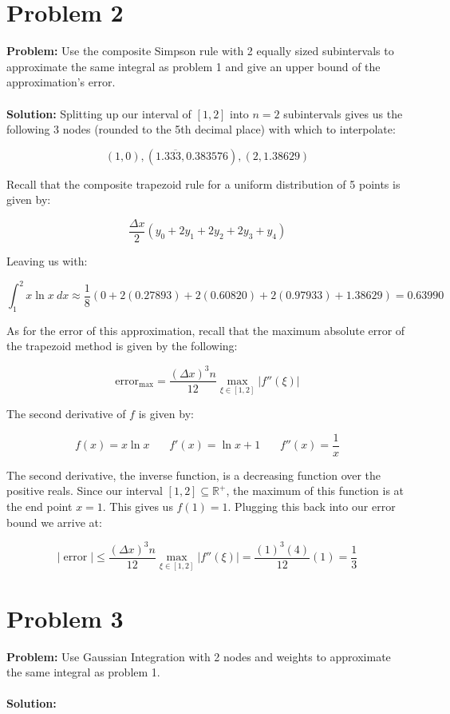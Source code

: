 \documentclass{article}
\begin{document}
\section*{Problem 2}
\textbf{Problem:} Use the composite Simpson rule with 2 equally sized subintervals to approximate the same integral as problem 1 and give an upper bound of the approximation's error.
\\\\
\textbf{Solution:} Splitting up our interval of $[1,2]$ into $n=2$ subintervals gives us the following 3 nodes (rounded to the 5th decimal place) with which to interpolate:

$$\left(1,0\right), \left(1.3\overline{33},0.383576\right), \left(2,1.38629\right)$$

Recall that the composite trapezoid rule for a uniform distribution of 5 points is given by:

$$\frac{\Delta x}{2}\left(y_0+2y_1+2y_2+2y_3+y_4\right)$$

Leaving us with:

$$\int^2_1 x\ln x\ dx\approx\frac{1}{8}\left(0+2(0.27893)+2(0.60820)+2(0.97933)+1.38629\right)=\boxed{0.63990}$$

As for the error of this approximation, recall that the maximum absolute error of the trapezoid method is given by the following:

$$\operatorname{error_{\text{max}}}=\frac{(\Delta x)^3n}{12}\max_{\xi\in[1,2]}|f''(\xi)|$$

The second derivative of $f$ is given by:

$$f(x)=x\ln x\ \ \ \ \ \ \ \  f'(x)=\ln x + 1\ \ \ \ \ \ \ \  f''(x)=\frac{1}{x}$$

The second derivative, the inverse function, is a decreasing function over the positive reals. Since our interval $[1,2]\subseteq\mathbb R^+$, the maximum of this function is at the end point $x=1$. This gives us $f(1)=1$. Plugging this back into our error bound we arrive at:

$$|\operatorname{error}|\le \frac{(\Delta x)^3n}{12}\max_{\xi\in[1,2]}|f''(\xi)|=\frac{(1)^3(4)}{12}(1)=\boxed{\frac{1}{3}}$$

\section*{Problem 3}
\textbf{Problem:} Use Gaussian Integration with 2 nodes and weights to approximate the same integral as problem 1.
\\\\
\textbf{Solution:}
\end{document}
